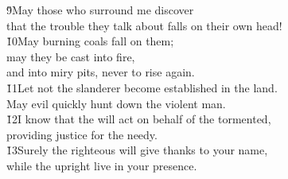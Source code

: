 \begin{poetry}
\poeml \v{9}May those who surround me discover \\
\poemll    that the trouble they talk about falls on their own head! \\
\poeml \v{10}May burning coals fall on them; \\
\poemll    may they be cast into fire, \\
\poemlll       and into miry pits, never to rise again. \\
\poeml \v{11}Let not the slanderer become established in the land. \\
\poemll    May evil quickly hunt down the violent man. \\
\poeml \v{12}I know that the  will act on behalf of the tormented, \\
\poemll    providing justice for the needy. \\
\poeml \v{13}Surely the righteous will give thanks to your name, \\
\poemll    while the upright live in your presence.
\end{poetry}

